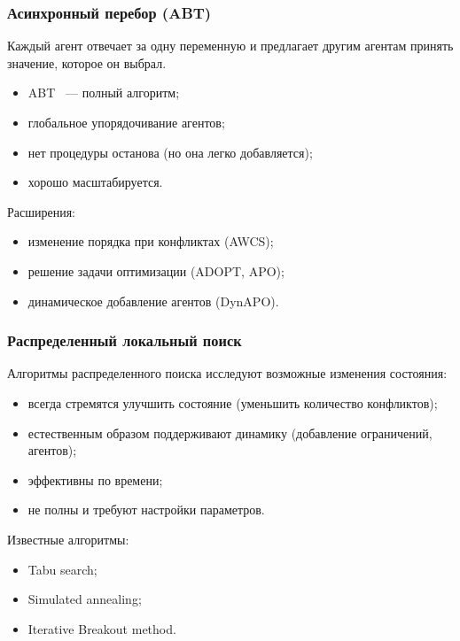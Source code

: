 \documentclass{beamer}
\begin{document}

\begin{frame}
  \frametitle{Асинхронный перебор (ABT)}
  Каждый агент отвечает за одну переменную и предлагает другим агентам принять значение,
  которое он выбрал.
  \begin{itemize}
    \item ABT ~--- полный алгоритм;
    \item глобальное упорядочивание агентов;
    \item нет процедуры останова (но она легко добавляется);
    \item хорошо масштабируется.
  \end{itemize}

  Расширения:
  \begin{itemize}
    \item изменение порядка при конфликтах (AWCS);
    \item решение задачи оптимизации (ADOPT, APO);
    \item динамическое добавление агентов (DynAPO).
  \end{itemize}
\end{frame}

\begin{frame}
  \frametitle{Распределенный локальный поиск}
  Алгоритмы распределенного поиска исследуют возможные изменения состояния:
  \begin{itemize}
    \item всегда стремятся улучшить состояние (уменьшить количество конфликтов);
    \item естественным образом поддерживают динамику (добавление ограничений, агентов);
    \item эффективны по времени;
    \item не полны и требуют настройки параметров.
  \end{itemize}

  Известные алгоритмы:
  \begin{itemize}
    \item Tabu search;
    \item Simulated annealing;
    \item Iterative Breakout method.
  \end{itemize}
\end{frame}
\end{document}
